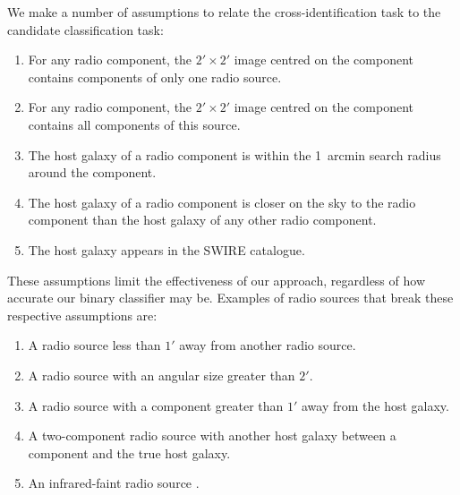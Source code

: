 \documentclass[fleqn,usenatbib,usedcolumn]{mnras}
\newcommand{\edited}[1]{#1}
\begin{document}
    We make a number of assumptions to relate the cross-identification task to
    the candidate classification task:
    \begin{enumerate}
      \item \edited{For any radio component, the $2' \times 2'$ image centred on the component contains components of only one radio source.}
      \item \edited{For any radio component, the $2' \times 2'$ image centred on the component contains all components of this source.}
      \item The host galaxy of a radio component is within the 1~arcmin \edited{search radius around} the
        component.
      \item The host galaxy of a radio component is closer on the sky to the
        radio component than the host galaxy of any other radio component.
      \item The host galaxy appears in the SWIRE catalogue.
    \end{enumerate}
    These assumptions limit the effectiveness of our approach, regardless of
    how accurate our binary classifier may be. \edited{Examples of radio sources that break these respective assumptions are:}
    \begin{enumerate}
      \item \edited{A radio source less than $1'$ away from another radio source.}
      \item \edited{A radio source with an angular size greater than $2'$.}
      \item \edited{A radio source with a component greater than $1'$ away from the host galaxy.}
      \item \edited{A two-component radio source with another host galaxy between a component and the true host galaxy.}
      \item \edited{An infrared-faint radio source \citep[as in][]{collier14irfaint}.}
    \end{enumerate}
\end{document}
